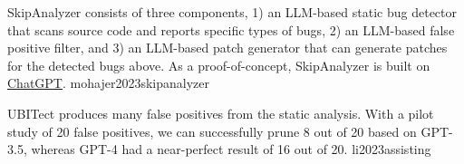 \documentclass{article}
\begin{document}

  {SkipAnalyzer consists of three components, 1) an LLM-based static bug detector that scans source code and reports specific types of bugs, 2) an LLM-based false positive filter, and 3) an LLM-based patch generator that can generate patches for the detected bugs above. As a proof-of-concept, SkipAnalyzer is built on \ul{ChatGPT}.}
  {mohajer2023skipanalyzer}

  {UBITect produces many false positives from the static analysis. With a pilot study of 20 false positives, we can successfully prune 8 out of 20 based on GPT-3.5, whereas GPT-4 had a near-perfect result of 16 out of 20.}
  {li2023assisting}
\end{document}
